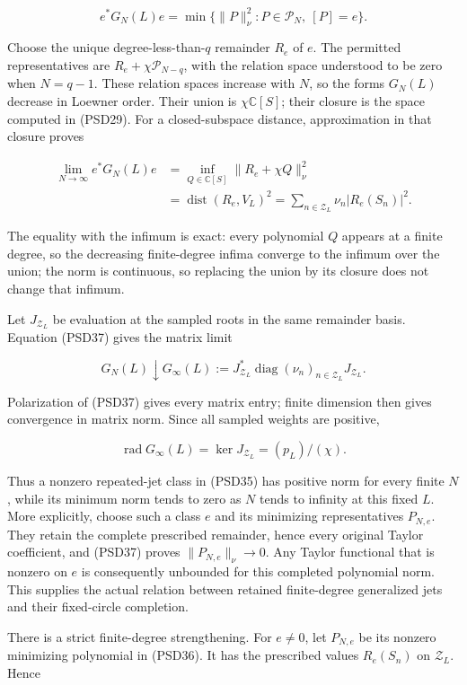 \[
e^*G_N(L)e=
\min\{\|P\|_\nu^2:P\in\mathcal P_N,\ [P]=e\}.
\tag{PSD36}
\]

Choose the unique degree-less-than-\(q\) remainder \(R_e\) of \(e\). The permitted representatives are \(R_e+\chi\mathcal P_{N-q}\), with the relation space understood to be zero when \(N=q-1\). These relation spaces increase with \(N\), so the forms \(G_N(L)\) decrease in Loewner order. Their union is \(\chi \mathbb{C}[S]\); their closure is the space computed in (PSD29). For a closed-subspace distance, approximation in that closure proves

\[
\begin{aligned}
\lim_{N\to\infty}e^*G_N(L)e
&=\inf_{Q\in\mathbb{C}[S]}\|R_e+\chi Q\|_\nu^2\\
&=\operatorname{dist}(R_e,V_L)^2
=\sum_{n\in\mathcal Z_L}\nu_n|R_e(S_n)|^2.
\end{aligned}
\tag{PSD37}
\]

The equality with the infimum is exact: every polynomial \(Q\) appears at a finite degree, so the decreasing finite-degree infima converge to the infimum over the union; the norm is continuous, so replacing the union by its closure does not change that infimum.

Let \(J_{\mathcal Z_L}\) be evaluation at the sampled roots in the same remainder basis. Equation (PSD37) gives the matrix limit

\[
G_N(L)\downarrow
G_\infty(L):=J_{\mathcal Z_L}^*
\operatorname{diag}(\nu_n)_{n\in\mathcal Z_L}J_{\mathcal Z_L}.
\tag{PSD38}
\]

Polarization of (PSD37) gives every matrix entry; finite dimension then gives convergence in matrix norm. Since all sampled weights are positive,

\[
\operatorname{rad}G_\infty(L)=\ker J_{\mathcal Z_L}
=(p_L)/(\chi).
\tag{PSD39}
\]

Thus a nonzero repeated-jet class in (PSD35) has positive norm for every finite \(N\), while its minimum norm tends to zero as \(N\) tends to infinity at this fixed \(L\). More explicitly, choose such a class \(e\) and its minimizing representatives \(P_{N,e}\). They retain the complete prescribed remainder, hence every original Taylor coefficient, and (PSD37) proves \(\|P_{N,e}\|_\nu\longrightarrow0\). Any Taylor functional that is nonzero on \(e\) is consequently unbounded for this completed polynomial norm. This supplies the actual relation between retained finite-degree generalized jets and their fixed-circle completion.

There is a strict finite-degree strengthening. For \(e \ne  0\), let \(P_{N,e}\) be its nonzero minimizing polynomial in (PSD36). It has the prescribed values \(R_e(S_n)\) on \(\mathcal Z_L\). Hence

